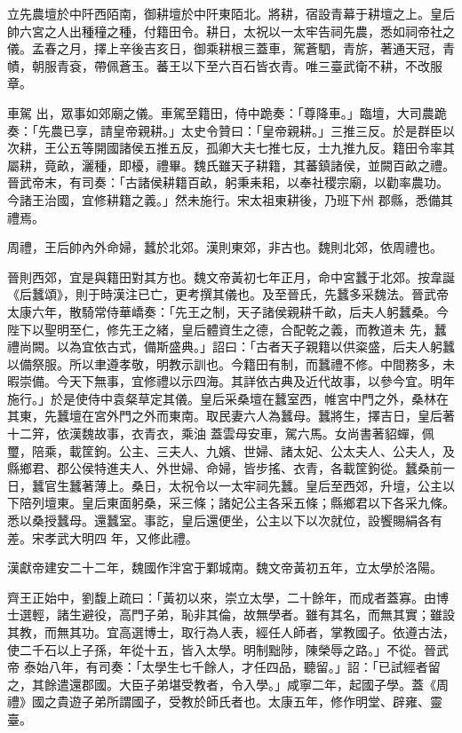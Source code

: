\begin{pinyinscope}
 立先農壇於中阡西陌南，御耕壇於中阡東陌北。將耕，宿設青幕于耕壇之上。皇后帥六宮之人出種穜之種，付籍田令。耕日，太祝以一太牢告祠先農，悉如祠帝社之儀。孟春之月，擇上辛後吉亥日，御乘耕根三蓋車，駕蒼駟，青旂，著通天冠，青幘，朝服青袞，帶佩蒼玉。蕃王以下至六百石皆衣青。唯三臺武衛不耕，不改服章。



 車駕
 出，眾事如郊廟之儀。車駕至籍田，侍中跪奏：「尊降車。」臨壇，大司農跪奏：「先農已享，請皇帝親耕。」太史令贊曰：「皇帝親耕。」三推三反。於是群臣以次耕，王公五等開國諸侯五推五反，孤卿大夫七推七反，士九推九反。籍田令率其屬耕，竟畝，灑種，即櫌，禮畢。魏氏雖天子耕籍，其蕃鎮諸侯，並闕百畝之禮。晉武帝末，有司奏：「古諸侯耕籍百畝，躬秉耒耜，以奉社稷宗廟，以勸率農功。今諸王治國，宜修耕籍之義。」然未施行。宋太祖東耕後，乃班下州
 郡縣，悉備其禮焉。



 周禮，王后帥內外命婦，蠶於北郊。漢則東郊，非古也。魏則北郊，依周禮也。



 晉則西郊，宜是與籍田對其方也。魏文帝黃初七年正月，命中宮蠶于北郊。按韋誕《后蠶頌》，則于時漢注已亡，更考撰其儀也。及至晉氏，先蠶多采魏法。晉武帝太康六年，散騎常侍華嶠奏：「先王之制，天子諸侯親耕千畝，后夫人躬蠶桑。今陛下以聖明至仁，修先王之緒，皇后體資生之德，合配乾之義，而教道未
 先，蠶禮尚闕。以為宜依古式，備斯盛典。」詔曰：「古者天子親籍以供粢盛，后夫人躬蠶以備祭服。所以聿遵孝敬，明教示訓也。今籍田有制，而蠶禮不修。中間務多，未暇崇備。今天下無事，宜修禮以示四海。其詳依古典及近代故事，以參今宜。明年施行。」於是使侍中袁粲草定其儀。皇后采桑壇在蠶室西，帷宮中門之外，桑林在其東，先蠶壇在宮外門之外而東南。取民妻六人為蠶母。蠶將生，擇吉日，皇后著十二笄，依漢魏故事，衣青衣，乘油
 蓋雲母安車，駕六馬。女尚書著貂蟬，佩璽，陪乘，載筐鉤。公主、三夫人、九嬪、世婦、諸太妃、公太夫人、公夫人，及縣鄉君、郡公侯特進夫人、外世婦、命婦，皆步搖、衣青，各載筐鉤從。蠶桑前一日，蠶官生蠶著薄上。桑日，太祝令以一太牢祠先蠶。皇后至西郊，升壇，公主以下陪列壇東。皇后東面躬桑，采三條；諸妃公主各采五條；縣鄉君以下各采九條。悉以桑授蠶母。還蠶室。事訖，皇后還便坐，公主以下以次就位，設饗賜絹各有差。宋孝武大明四
 年，又修此禮。



 漢獻帝建安二十二年，魏國作泮宮于鄴城南。魏文帝黃初五年，立太學於洛陽。



 齊王正始中，劉馥上疏曰：「黃初以來，崇立太學，二十餘年，而成者蓋寡。由博士選輕，諸生避役，高門子弟，恥非其倫，故無學者。雖有其名，而無其實；雖設其教，而無其功。宜高選博士，取行為人表，經任人師者，掌教國子。依遵古法，使二千石以上子孫，年從十五，皆入太學。明制黜陟，陳榮辱之路。」不從。晉武帝
 泰始八年，有司奏：「太學生七千餘人，才任四品，聽留。」詔：「已試經者留之，其餘遣還郡國。大臣子弟堪受教者，令入學。」咸寧二年，起國子學。蓋《周禮》國之貴遊子弟所謂國子，受教於師氏者也。太康五年，修作明堂、辟雍、靈臺。




\end{pinyinscope}
